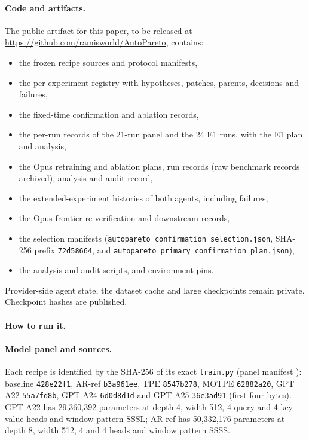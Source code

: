 \documentclass{article}
\newif\ifshowhumanmarkers \showhumanmarkersfalse
\newcommand{\releasepending}{\ifshowhumanmarkers{\color{humanframe}\sffamily\scriptsize\bfseries[RELEASE PENDING]}\ \fi}
\begin{document}
\paragraph{Code and artifacts.} \releasepending The public artifact for this paper, to be released at \url{https://github.com/ramisworld/AutoPareto}, contains:
{\setlength{\leftmargini}{1.2em}\begin{itemize}\setlength{\itemsep}{0pt}\setlength{\parskip}{0pt}\setlength{\topsep}{2pt}
\item the frozen recipe sources and protocol manifests,
\item the per-experiment registry with hypotheses, patches, parents, decisions and failures,
\item the fixed-time confirmation and ablation records,
\item the per-run records of the 21-run panel and the 24 E1 runs, with the E1 plan and analysis,
\item the Opus retraining and ablation plans, run records (raw benchmark records archived), analysis and audit record,
\item the extended-experiment histories of both agents, including failures,
\item the Opus frontier re-verification and downstream records,
\item the selection manifests (\texttt{autopareto\_confirmation\_selection.json}, SHA-256 prefix \texttt{72d58664}, and \texttt{autopareto\_primary\_confirmation\_plan.json}),
\item the analysis and audit scripts, and environment pins.
\end{itemize}}
Provider-side agent state, the dataset cache and large checkpoints remain private. Checkpoint hashes are published.

\paragraph{How to run it.}\label{app:howto} 

\paragraph{Model panel and sources.} Each recipe is identified by the SHA-256 of its exact \texttt{train.py} (panel manifest ): baseline \texttt{428e22f1}, AR-ref \texttt{b3a961ee}, TPE \texttt{8547b278}, MOTPE \texttt{62882a20}, GPT A22 \texttt{55a7fd8b}, GPT A24 \texttt{6d0d8d1d} and GPT A25 \texttt{36e3ad91} (first four bytes). GPT A22 has 29,360,392 parameters at depth 4, width 512, 4 query and 4 key-value heads and window pattern SSSL; AR-ref has 50,332,176 parameters at depth 8, width 512, 4 and 4 heads and window pattern SSSS.
\end{document}

